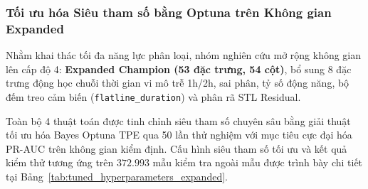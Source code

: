 \subsubsection{Tối ưu hóa Siêu tham số bằng Optuna trên Không gian Expanded}
\label{sec:optuna_tuning}

Nhằm khai thác tối đa năng lực phân loại, nhóm nghiên cứu mở rộng không gian lên cấp độ 4: \textbf{Expanded Champion (53 đặc trưng, 54 cột)}, bổ sung 8 đặc trưng động học chuỗi thời gian vi mô trễ 1h/2h, sai phân, tỷ số động năng, bộ đếm treo cảm biến (\texttt{flatline\_duration}) và phân rã STL Residual.

Toàn bộ 4 thuật toán được tinh chỉnh siêu tham số chuyên sâu bằng giải thuật tối ưu hóa Bayes Optuna TPE qua 50 lần thử nghiệm với mục tiêu cực đại hóa PR-AUC trên không gian kiểm định. Cấu hình siêu tham số tối ưu và kết quả kiểm thử tương ứng trên $372.993$ mẫu kiểm tra ngoài mẫu được trình bày chi tiết tại Bảng~\ref{tab:tuned_hyperparameters_expanded}.

\begin{table}[H]
\centering
\caption{\textbf{Cấu hình Siêu tham số Tối ưu hóa Optuna và Hiệu năng Đơn lẻ trên Không gian Expanded (53 Đặc trưng)}}
\label{tab:tuned_hyperparameters_expanded}
\renewcommand{\arraystretch}{1.2}
\end{table}

